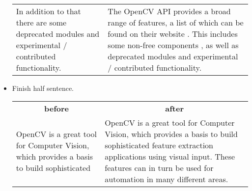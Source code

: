 \documentclass[12pt, a4paper]{article}
\begin{document}
\begin{itemize}
\begin{tabular}{p{.5\linewidth} p{.5\linewidth}}
		In addition to that there are some deprecated modules and experimental / contributed functionality. \cite{openCVRefMan}&
		The OpenCV API provides a broad range of features, a list of which can be found on their website \cite{openCVRefMan}. This includes some non-free components \cite{openCVNonFree}, as well as deprecated modules and experimental / contributed functionality.\\
	\end{tabular}
	\item Finish half sentence.

	\begin{tabular}{p{.5\linewidth} p{.5\linewidth}}
		\multicolumn{1}{c}{\textbf{before}} & \multicolumn{1}{c}{\textbf{after}}\\
		OpenCV is a great tool for Computer Vision, which provides a basis to build sophisticated&
		OpenCV is a great tool for Computer Vision, which provides a basis to build sophisticated feature extraction applications using visual input. These features can in turn be used for automation in many different areas.\\
	\end{tabular}
\end{itemize}
\end{document}
